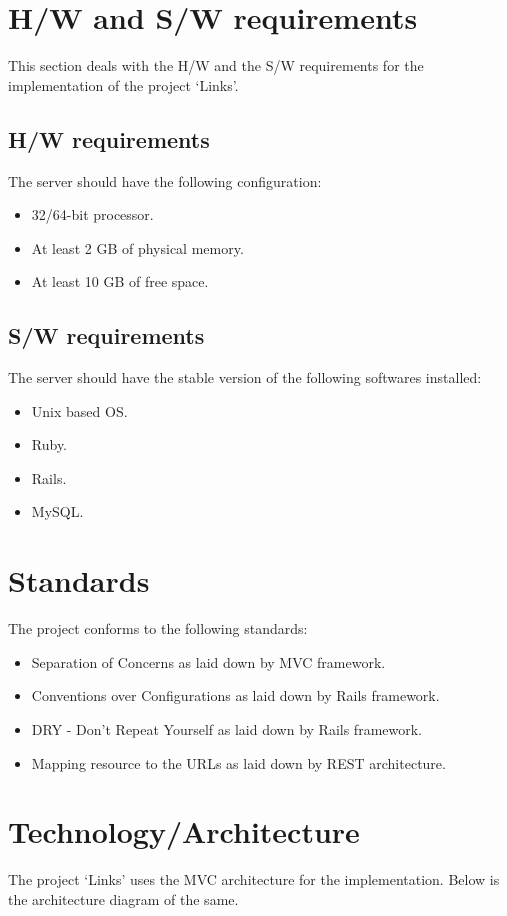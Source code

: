 \documentclass[11pt]{report} %
\begin{document}
\section*{H/W and S/W requirements}
This section deals with the H/W and the S/W requirements for the implementation of the project `Links'.
\subsection*{H/W requirements}
The server should have the following configuration:
\begin{itemize}
\item
32/64-bit processor.
\item
At least 2 GB of physical memory.
\item
At least 10 GB of free space.
\end{itemize}

\subsection*{S/W requirements}
The server should have the stable version of the following softwares installed:
\begin{itemize}
\item
Unix based OS.
\item
Ruby.
\item
Rails.
\item
MySQL.
\end{itemize}

\section*{Standards}
The project conforms to the following standards:
\begin{itemize}
\item
Separation of Concerns as laid down by MVC framework.
\item
Conventions over Configurations as laid down by Rails framework.
\item
DRY - Don't Repeat Yourself as laid down by Rails framework.
\item
Mapping resource to the URLs as laid down by REST architecture.
\end{itemize}

\section*{Technology/Architecture}
The project `Links' uses the MVC architecture for the implementation. Below is the architecture diagram of the same.
\end{document}
